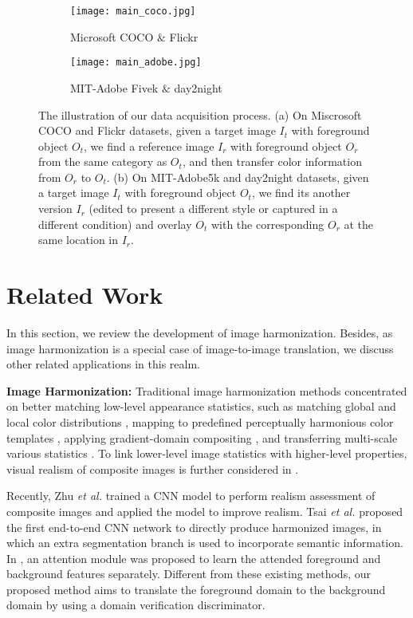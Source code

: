 \documentclass[10pt,twocolumn,letterpaper]{article}
\begin{document}
\begin{figure*}	
	\centering
	\begin{subfigure}[t]{3.2in}
		\centering
		\texttt{[image: main\_coco.jpg]}
		\caption{Microsoft COCO $\&$ Flickr}\label{Fig:coco_acq}		
	\end{subfigure}
	\quad
	\begin{subfigure}[t]{3.2in}
		\centering
		\texttt{[image: main\_adobe.jpg]}
		\caption{MIT-Adobe Fivek $\&$ day2night}\label{Fig:adobe_acq}
	\end{subfigure}
	\caption{The illustration of our data acquisition process. (a) On Miscrosoft COCO and Flickr datasets, given a target image $I_t$ with foreground object $O_t$, we find a reference image $I_r$ with foreground object $O_r$ from the same category as $O_t$, and then transfer color information from $O_r$ to $O_t$. (b) On MIT-Adobe5k and day2night datasets, given a target image $I_t$ with foreground object $O_t$, we find its another version $I_r$ (edited to present a different style or captured in a different condition) and overlay $O_t$ with the corresponding $O_r$ at the same location in $I_r$.}\label{fig:data_acq}
\end{figure*}

\section{Related Work}
In this section, we review the development of image harmonization. Besides, as image harmonization is a special case of image-to-image translation, we discuss other related applications in this realm.

\textbf{Image Harmonization: }Traditional image harmonization methods concentrated on better matching low-level appearance statistics, such as matching global and local color distributions \cite{Pitie2005ndimensional,reinhard2001color}, mapping to predefined perceptually harmonious color templates \cite{colorharmonization}, applying gradient-domain compositing \cite{poisson,dragdroppaste,error-tolerant}, and transferring multi-scale various statistics \cite{multi-scale}. To link lower-level image statistics with higher-level properties, visual realism of composite images is further considered in \cite{lalonde2007using,xue2012understanding}. 

Recently, Zhu \emph{et al.} \cite{zhu2015learning} trained a CNN model to perform realism assessment of composite images and applied the model to improve realism. Tsai \emph{et al.} \cite{tsai2017deep} proposed the first end-to-end CNN network to directly produce harmonized images, in which an extra segmentation branch is used to incorporate semantic information. In \cite{xiaodong2019improving}, an attention module was proposed to learn the attended foreground and background features separately. Different from these existing methods, our proposed method aims to translate the foreground domain to the background domain by using a domain verification discriminator.
\end{document}
